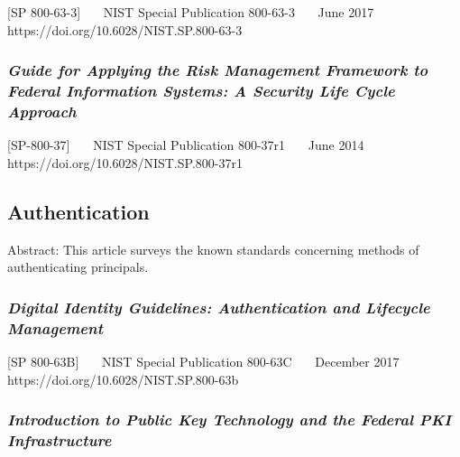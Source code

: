 {[}SP 800-63-3{]}~~~ NIST Special Publication 800-63-3~~~ June 2017~~~
https://doi.org/10.6028/NIST.SP.800-63-3~~~

\hypertarget{guide-for-applying-the-risk-management-framework-to-federal-information-systems-a-security-life-cycle-approach}{%
\subsubsection{\texorpdfstring{\emph{Guide for Applying the Risk Management
Framework to Federal Information Systems: A Security Life Cycle
Approach}}{Guide for Applying the Risk Management Framework to Federal Information Systems: A Security Life Cycle Approach}}\label{guide-for-applying-the-risk-management-framework-to-federal-information-systems-a-security-life-cycle-approach}}

{[}SP-800-37{]}~~~ NIST Special Publication 800-37r1~~~ June 2014~~~
https://doi.org/10.6028/NIST.SP.800-37r1~~~

\hypertarget{authentication-2}{%
\subsection{Authentication}\label{authentication-2}}

Abstract: This article surveys the known standards concerning methods of
authenticating principals.

\hypertarget{digital-identity-guidelines-authentication-and-lifecycle-management}{%
\subsubsection{\texorpdfstring{\emph{Digital Identity Guidelines:
Authentication and Lifecycle
Management}}{Digital Identity Guidelines: Authentication and Lifecycle Management}}\label{digital-identity-guidelines-authentication-and-lifecycle-management}}

{[}SP 800-63B{]}~~~ NIST Special Publication 800-63C~~~ December 2017~~~
https://doi.org/10.6028/NIST.SP.800-63b~~~

\hypertarget{introduction-to-public-key-technology-and-the-federal-pki-infrastructure}{%
\subsubsection{\texorpdfstring{\emph{Introduction to Public Key Technology
and the Federal PKI
Infrastructure}}{Introduction to Public Key Technology and the Federal PKI Infrastructure}}\label{introduction-to-public-key-technology-and-the-federal-pki-infrastructure}}

